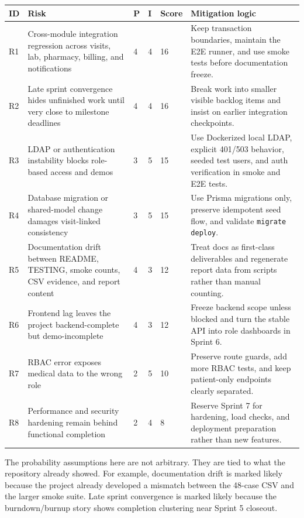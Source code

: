 \documentclass[11pt,a4paper]{article}
\begin{document}
\begin{center}
\begin{longtable}{|p{0.8cm}|p{4.1cm}|p{0.8cm}|p{0.8cm}|p{1.2cm}|p{6cm}|}
\hline
\rowcolor{SoftBlue}
\textbf{ID} & \textbf{Risk} & \textbf{P} & \textbf{I} & \textbf{Score} & \textbf{Mitigation logic} \\
\hline
R1 & Cross-module integration regression across visits, lab, pharmacy, billing, and notifications & 4 & 4 & 16 & Keep transaction boundaries, maintain the E2E runner, and use smoke tests before documentation freeze. \\
\hline
R2 & Late sprint convergence hides unfinished work until very close to milestone deadlines & 4 & 4 & 16 & Break work into smaller visible backlog items and insist on earlier integration checkpoints. \\
\hline
R3 & LDAP or authentication instability blocks role-based access and demos & 3 & 5 & 15 & Use Dockerized local LDAP, explicit 401/503 behavior, seeded test users, and auth verification in smoke and E2E tests. \\
\hline
R4 & Database migration or shared-model change damages visit-linked consistency & 3 & 5 & 15 & Use Prisma migrations only, preserve idempotent seed flow, and validate \texttt{migrate deploy}. \\
\hline
R5 & Documentation drift between README, TESTING, smoke counts, CSV evidence, and report content & 4 & 3 & 12 & Treat docs as first-class deliverables and regenerate report data from scripts rather than manual counting. \\
\hline
R6 & Frontend lag leaves the project backend-complete but demo-incomplete & 4 & 3 & 12 & Freeze backend scope unless blocked and turn the stable API into role dashboards in Sprint 6. \\
\hline
R7 & RBAC error exposes medical data to the wrong role & 2 & 5 & 10 & Preserve route guards, add more RBAC tests, and keep patient-only endpoints clearly separated. \\
\hline
R8 & Performance and security hardening remain behind functional completion & 2 & 4 & 8 & Reserve Sprint 7 for hardening, load checks, and deployment preparation rather than new features. \\
\hline
\end{longtable}
\end{center}

The probability assumptions here are not arbitrary. They are tied to what the repository already showed. For example, documentation drift is marked likely because the project already developed a mismatch between the 48-case CSV and the larger smoke suite. Late sprint convergence is marked likely because the burndown/burnup story shows completion clustering near Sprint 5 closeout.
\end{document}
